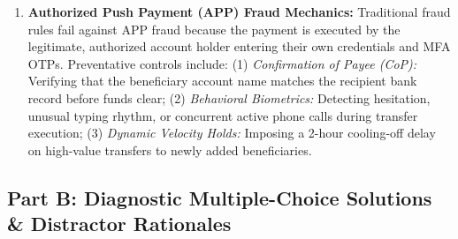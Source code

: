 \begin{enumerate}[label=\textbf{P7.\arabic*}]
    \item \textbf{Authorized Push Payment (APP) Fraud Mechanics:}
    Traditional fraud rules fail against APP fraud because the payment is executed by the legitimate, authorized account holder entering their own credentials and MFA OTPs. Preventative controls include: (1) \textit{Confirmation of Payee (CoP):} Verifying that the beneficiary account name matches the recipient bank record before funds clear; (2) \textit{Behavioral Biometrics:} Detecting hesitation, unusual typing rhythm, or concurrent active phone calls during transfer execution; (3) \textit{Dynamic Velocity Holds:} Imposing a 2-hour cooling-off delay on high-value transfers to newly added beneficiaries.
\end{enumerate}

\subsection*{Part B: Diagnostic Multiple-Choice Solutions \& Distractor Rationales}

